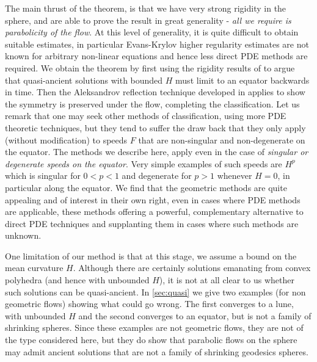 \documentclass{amsart}
\begin{document}
The main thrust of the theorem, is that we have very strong rigidity in the sphere, and are able to prove the result in great generality - \emph{all we require is parabolicity of the flow}. At this level of generality, it is quite difficult to obtain suitable estimates, in particular Evans-Krylov higher regularity estimates are not known for arbitrary non-linear equations and hence less direct PDE methods are required. We obtain the theorem by first using the rigidity results of \cite{MakowskiScheuer:/2013} to argue that quasi-ancient solutions with bounded \(H\) must limit to an equator backwards in time. Then the Aleksandrov reflection technique developed in \cite{bryanlouie,2015arXiv150802821B} applies to show the symmetry is preserved under the flow, completing the classification. Let us remark that one may seek other methods of classification, using more PDE theoretic techniques, but they tend to suffer the draw back that they only apply (without modification) to speeds \(F\) that are non-singular and non-degenerate on the equator. The methods we describe here, apply even in the case of \emph{singular or degenerate speeds on the equator}. Very simple examples of such speeds are \(H^p\) which is singular for \(0 < p < 1\) and degenerate for \(p > 1\) whenever \(H = 0\), in particular along the equator. We find that the geometric methods are quite appealing and of interest in their own right, even in cases where PDE methods are applicable, these methods offering a powerful, complementary alternative to direct PDE techniques and supplanting them in cases where such methods are unknown.

One limitation of our method is that at this stage, we assume a bound on the mean curvature \(H\). Although there are certainly solutions emanating from convex polyhedra (and hence with unbounded \(H\)), it is not at all clear to us whether such solutions can be quasi-ancient. In \cref{sec:quasi} we give two examples (for non geometric flows) showing what could go wrong. The first converges to a lune, with unbounded \(H\) and the second converges to an equator, but is not a family of shrinking spheres. Since these examples are not geometric flows, they are not of the type considered here, but they do show that parabolic flows on the sphere may admit ancient solutions that are not a family of shrinking geodesics spheres.
\end{document}
